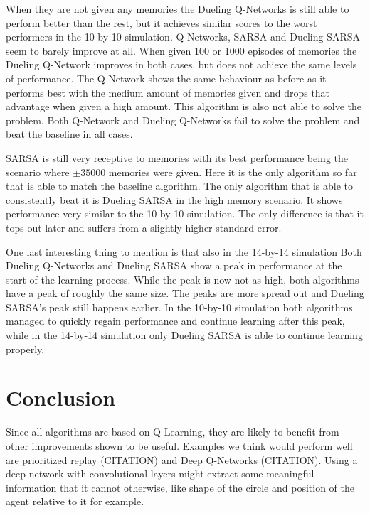 When they are not given any memories the Dueling Q-Networks is still able to perform better than the rest, but it achieves similar scores to the worst performers in the 10-by-10 simulation. Q-Networks, SARSA and Dueling SARSA seem to barely improve at all. When given 100 or 1000 episodes of memories the Dueling Q-Network improves in both cases, but does not achieve the same levels of performance. The Q-Network shows the same behaviour as before as it performs best with the medium amount of memories given and drops that advantage when given a high amount. This algorithm is also not able to solve the problem. Both Q-Network and Dueling Q-Networks fail to solve the problem and beat the baseline in all cases.

SARSA is still very receptive to memories with its best performance being the scenario where $\pm 35000$ memories were given. Here it is the only algorithm so far that is able to match the baseline algorithm. The only algorithm that is able to consistently beat it is Dueling SARSA in the high memory scenario. It shows performance very similar to the 10-by-10 simulation. The only difference is that it tops out later and suffers from a slightly higher standard error.

One last interesting thing to mention is that also in the 14-by-14 simulation Both Dueling Q-Networks and Dueling SARSA show a peak in performance at the start of the learning process. While the peak is now not as high, both algorithms have a peak of roughly the same size. The peaks are more spread out and Dueling SARSA's peak still happens earlier. In the 10-by-10 simulation both algorithms managed to quickly regain performance and continue learning after this peak, while in the 14-by-14 simulation only Dueling SARSA is able to continue learning properly.

\section{Conclusion}\label{sec:conclusions}
Since all algorithms are based on Q-Learning, they are likely to benefit from other improvements shown to be useful. Examples we think would perform well are prioritized replay (CITATION) and Deep Q-Networks (CITATION). Using a deep network with convolutional layers might extract some meaningful information that it cannot otherwise, like shape of the circle and position of the agent relative to it for example.

